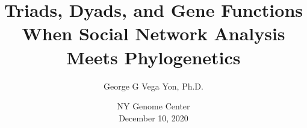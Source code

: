 \documentclass[aspectratio=169,9pt,handout]{beamer}
\title[SNA Meets Phylogenetics]{%
	Triads, Dyads, and Gene Functions\\When Social Network Analysis Meets Phylogenetics
}
\author[GGVY -- \href{vegayon@usc.edu}{vegayon@usc.edu}]{George G Vega Yon, Ph.D.}
\institute[USC-PREVMED]{University of Southern California, Department of Preventive Medicine}
\date{NY Genome Center\\December 10, 2020}
\begin{document}
\begin{frame}%
\maketitle
\vspace{-.5cm}
%
\end{frame}

%
%
%
\end{document}
